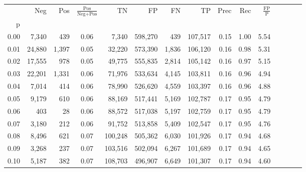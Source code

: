 \begin{tabular}{rrrcrrrrrrrrrrr}
\toprule
{} &     Neg &    Pos & $\frac{\text{Pos}}{\text{Neg}+\text{Pos}}$ &       TN &       FP &       FN &       TP &  Prec &   Rec & $\frac{\text{FP}}{\text{P}}$ \\
p    &         &        &                                            &          &          &          &          &       &       &                              \\
\midrule
0.00 &   7,340 &    439 &                                       0.06 &    7,340 &  598,270 &      439 &  107,517 &  0.15 &  1.00 &                         5.54 \\
0.01 &  24,880 &  1,397 &                                       0.05 &   32,220 &  573,390 &    1,836 &  106,120 &  0.16 &  0.98 &                         5.31 \\
0.02 &  17,555 &    978 &                                       0.05 &   49,775 &  555,835 &    2,814 &  105,142 &  0.16 &  0.97 &                         5.15 \\
0.03 &  22,201 &  1,331 &                                       0.06 &   71,976 &  533,634 &    4,145 &  103,811 &  0.16 &  0.96 &                         4.94 \\
0.04 &   7,014 &    414 &                                       0.06 &   78,990 &  526,620 &    4,559 &  103,397 &  0.16 &  0.96 &                         4.88 \\
0.05 &   9,179 &    610 &                                       0.06 &   88,169 &  517,441 &    5,169 &  102,787 &  0.17 &  0.95 &                         4.79 \\
0.06 &     403 &     28 &                                       0.06 &   88,572 &  517,038 &    5,197 &  102,759 &  0.17 &  0.95 &                         4.79 \\
0.07 &   3,180 &    212 &                                       0.06 &   91,752 &  513,858 &    5,409 &  102,547 &  0.17 &  0.95 &                         4.76 \\
0.08 &   8,496 &    621 &                                       0.07 &  100,248 &  505,362 &    6,030 &  101,926 &  0.17 &  0.94 &                         4.68 \\
0.09 &   3,268 &    237 &                                       0.07 &  103,516 &  502,094 &    6,267 &  101,689 &  0.17 &  0.94 &                         4.65 \\
0.10 &   5,187 &    382 &                                       0.07 &  108,703 &  496,907 &    6,649 &  101,307 &  0.17 &  0.94 &                         4.60 \\

\end{tabular}
